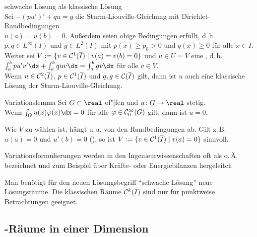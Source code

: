 \begin{Satz}{schwache Lösung als klassische Lösung}\\
    Sei $-(pu')' + qu = g$ die Sturm-Liouville-Gleichung mit
    Dirichlet-Randbedingungen\\
    $u(a) = u(b) = 0$.
    Außerdem seien obige Bedingungen erfüllt, d.\,h.\\
    $p, q \in L^\infty(I)$ und $g \in L^2(I)$ mit
    $p(x) \ge p_0 > 0$ und $q(x) \ge 0$ für alle $x \in \overline{I}$.\\
    Weiter sei $V := \{v \in \mathcal{C}^1(\overline{I}) \;|\; v(a) = v(b) = 0\}$
    und $u \in U = V$ eine , d.\,h.
    $\int_a^b pu'v'\dx + \int_a^b quv\dx = \int_a^b gv\dx$ für alle $v \in V$.\\
    Wenn $u \in \mathcal{C}^2(\overline{I})$, $p \in \mathcal{C}^1(\overline{I})$ und
    $q, g \in \mathcal{C}(\overline{I})$ gilt, dann ist $u$ auch eine klassische
    Lösung der Sturm-Liouville-Gleichung.
\end{Satz}

\begin{Lemma}{Variationslemma}
    Sei $G \subset \real$ of"|fen und $u\colon G \rightarrow \real$ stetig.\\
    Wenn $\int_G u(x)\varphi(x)\dx = 0$ für alle $\varphi \in \mathcal{C}_0^\infty(G)$
    gilt, dann ist $u = 0$.
\end{Lemma}

\linie

\begin{Bem}
    Wie $V$ zu wählen ist, hängt u.\,a. von den Randbedingungen ab.
    Gilt z.\,B. $u(a) = 0$ und $u'(b) = 0$
    (), so ist
    $V := \{v \in \mathcal{C}^1(\overline{I}) \;|\; v(a) = 0\}$ sinnvoll.
\end{Bem}

\begin{Bem}
    Variationsformulierungen werden in den Ingenieurwissenschaften oft als
     o.\,Ä. bezeichnet
    und zum Beispiel über Kräfte- oder Energiebilanzen hergeleitet.
\end{Bem}

\begin{Bem}
    Man benötigt für den neuen Lösungsbegriff "`schwache Lösung"'
    neue Lösungsräume.
    Die klassischen Räume $\mathcal{C}^k(I)$ sind nur für punktweise Betrachtungen
    geeignet.
\end{Bem}

\subsection{%
    -Räume in einer Dimension%
}

